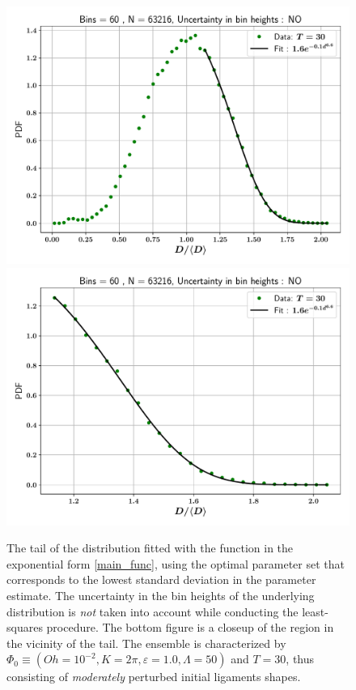 
\begin{figure}
\centering
\includegraphics{plots/drop_stats/linear_tail_fit_uncertainty_no.pdf} \\
\includegraphics{plots/drop_stats/linear_zoom_tail_fit_uncertainty_no.pdf} \\ 
\caption{
	The tail of the distribution fitted with the function 
	in the exponential form \eqref{main_func}, using the optimal parameter
	set that corresponds to the lowest standard deviation in the parameter estimate.
	The uncertainty in the bin heights of the underlying distribution is \textit{not}
	taken into account while conducting the least-squares procedure. 
	The bottom figure is a closeup of the region in the vicinity of the tail.
	The ensemble is characterized by $\Phi_0 \equiv \left( Oh = 10^{-2}, K = 2\pi 
	, \varepsilon = 1.0 , \Lambda = 50 \right)$ and $T = 30$, 
	thus consisting of \textit{moderately} perturbed initial ligaments shapes. 
	}
\label{linear_fits_wo}
\end{figure}

